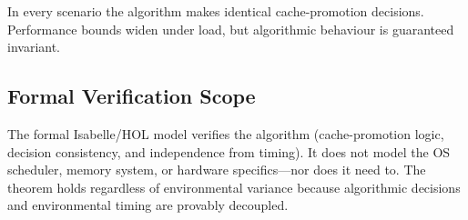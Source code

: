 In every scenario the algorithm makes identical cache-promotion decisions. Performance
bounds widen under load, but algorithmic behaviour is guaranteed invariant.

\subsection{Formal Verification Scope}

The formal Isabelle/HOL model verifies the algorithm (cache-promotion logic, decision
consistency, and independence from timing). It does not model the OS scheduler, memory
system, or hardware specifics---nor does it need to. The theorem holds regardless of
environmental variance because algorithmic decisions and environmental timing are
provably decoupled.
